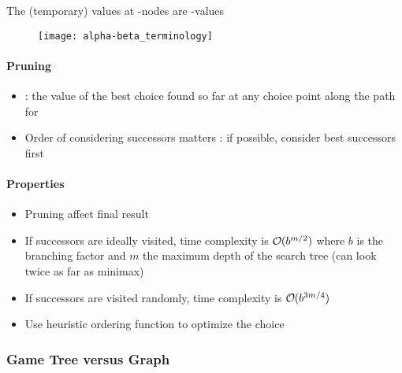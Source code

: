 \begin{minipage}{0.58\textwidth}
	The (temporary) values at -nodes are -values
\end{minipage}
\begin{minipage}{0.4\textwidth}
	\begin{figure}[H]
		\centering
		\texttt{[image: alpha-beta\_terminology]}
	\end{figure}
\end{minipage}

\paragraph{Pruning}

\begin{itemize}
\item \stackanchor[8pt]{\textblue{$\alpha$}}{\textred{$\beta$}} : the value of the best  choice found so far at any choice point along the path for 
\item Order of considering successors matters : if possible, consider best successors first
\end{itemize}

\paragraph{Properties}

\begin{itemize}
\item Pruning  affect final result
\item If successors are ideally visited, time complexity is $\bigO (b^{m/2})$ where $b$ is the branching factor and $m$ the maximum depth of the search tree (can look twice as far as minimax)
\item If successors are visited randomly, time complexity is $\bigO (b^{3m/4})$
\item Use heuristic ordering function to optimize the choice
\end{itemize}

\subsubsection{Game Tree versus Graph}

